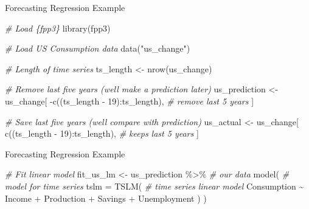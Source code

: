 \documentclass[
  ignorenonframetext,
]{beamer}
\newenvironment{Shaded}{\begin{snugshade}}{\end{snugshade}}
\newcommand{\AttributeTok}[1]{\textcolor[rgb]{0.77,0.63,0.00}{#1}}
\newcommand{\CommentTok}[1]{\textcolor[rgb]{0.56,0.35,0.01}{\textit{#1}}}
\newcommand{\DecValTok}[1]{\textcolor[rgb]{0.00,0.00,0.81}{#1}}
\newcommand{\FunctionTok}[1]{\textcolor[rgb]{0.00,0.00,0.00}{#1}}
\newcommand{\NormalTok}[1]{#1}
\newcommand{\OtherTok}[1]{\textcolor[rgb]{0.56,0.35,0.01}{#1}}
\newcommand{\SpecialCharTok}[1]{\textcolor[rgb]{0.00,0.00,0.00}{#1}}
\newcommand{\StringTok}[1]{\textcolor[rgb]{0.31,0.60,0.02}{#1}}
\begin{document}
\begin{frame}[fragile]{Forecasting \textbar{} \small Regression Example}
\protect\hypertarget{forecasting-regression-example-1}{}
\footnotesize

\normalfont

\footnotesize

\begin{Shaded}
\begin{Highlighting}[]
\CommentTok{\# Load \{fpp3\}}
\FunctionTok{library}\NormalTok{(fpp3)}

\CommentTok{\# Load US Consumption data}
\FunctionTok{data}\NormalTok{(}\StringTok{"us\_change"}\NormalTok{)}

\CommentTok{\# Length of time series}
\NormalTok{ts\_length }\OtherTok{\textless{}{-}} \FunctionTok{nrow}\NormalTok{(us\_change)}

\CommentTok{\# Remove last five years (we\textquotesingle{}ll make a prediction later) }
\NormalTok{us\_prediction }\OtherTok{\textless{}{-}}\NormalTok{ us\_change[}
  \SpecialCharTok{{-}}\FunctionTok{c}\NormalTok{((ts\_length }\SpecialCharTok{{-}} \DecValTok{19}\NormalTok{)}\SpecialCharTok{:}\NormalTok{ts\_length), }\CommentTok{\# remove last 5 years}
\NormalTok{]}

\CommentTok{\# Save last five years (we\textquotesingle{}ll compare with prediction)}
\NormalTok{us\_actual }\OtherTok{\textless{}{-}}\NormalTok{ us\_change[}
  \FunctionTok{c}\NormalTok{((ts\_length }\SpecialCharTok{{-}} \DecValTok{19}\NormalTok{)}\SpecialCharTok{:}\NormalTok{ts\_length), }\CommentTok{\# keeps last 5 years}
\NormalTok{]}
\end{Highlighting}
\end{Shaded}

\normalfont
\end{frame}

\begin{frame}[fragile]{Forecasting \textbar{} \small Regression Example}
\protect\hypertarget{forecasting-regression-example-2}{}
\footnotesize

\begin{Shaded}
\begin{Highlighting}[]
\CommentTok{\# Fit linear model}
\NormalTok{fit\_us\_lm }\OtherTok{\textless{}{-}}\NormalTok{ us\_prediction }\SpecialCharTok{\%\textgreater{}\%} \CommentTok{\# our data}
  \FunctionTok{model}\NormalTok{( }\CommentTok{\# model for time series}
    \AttributeTok{tslm =} \FunctionTok{TSLM}\NormalTok{( }\CommentTok{\# time series linear model}
\NormalTok{      Consumption }\SpecialCharTok{\textasciitilde{}}\NormalTok{ Income }\SpecialCharTok{+}\NormalTok{ Production }\SpecialCharTok{+}\NormalTok{ Savings }\SpecialCharTok{+}\NormalTok{ Unemployment}
\NormalTok{    )}
\NormalTok{  )}
\end{Highlighting}
\end{Shaded}

\normalfont
\end{frame}
\end{document}
